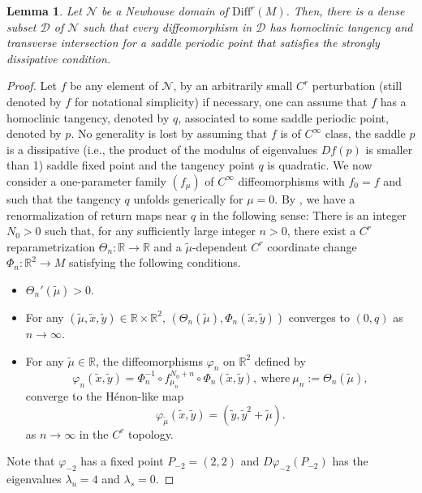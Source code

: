 \documentclass{amsart}
\theoremstyle{plain}
\newtheorem{lem}[thm]{Lemma}
\theoremstyle{definition}
\theoremstyle{remark}
\numberwithin{equation}{section}
\begin{document}
\begin{lem}
Let $\mathcal{N}$ be a Newhouse domain of $\mathrm{Diff}^r(M)$. Then, there is a dense subset $\mathcal{D}$ of $\mathcal{N}$ such that 
every diffeomorphism in $\mathcal{D}$ 
has homoclinic tangency and transverse intersection for 
a saddle periodic point that satisfies the strongly dissipative condition.
\end{lem}
\begin{proof}
Let $f$ be any element of $\mathcal{N}$, by an arbitrarily small $C^r$ perturbation (still denoted by $f$ for notational simplicity) if necessary, one can assume that $f$ has a homoclinic tangency, denoted by $q$, associated to some saddle periodic point, denoted by $p$. 
No generality is lost by assuming that $f$ is of $C^{\infty}$ class,  
the saddle $p$ is a dissipative (i.e., the product of the modulus of eigenvalues $Df(p)$ is smaller than 1) saddle fixed point
 and the tangency point $q$ is quadratic.
We now consider a one-parameter family $(f_{\mu})$ of $C^{\infty}$ diffeomorphisms with $f_{0}=f$ and such that the  tangency $q$ unfolds generically for $\mu=0$. 
By \cite[\S 3.4, Theorem 1]{PT1995}, we have a 
renormalization of return maps near $q$ in the following sense:
There is an integer $N_{0}>0$ such that, for any sufficiently large integer $n>0$, 
there exist a $C^{r}$ reparametrization  $\Theta_{n}:\mathbb{R}\to \mathbb{R}$ and a $\tilde \mu$-dependent $C^r$ coordinate change $\Phi_{n}:\mathbb{R}^2\to M$ satisfying the following conditions.
\begin{itemize}
\item
$\Theta_{n}'(\tilde \mu)>0$.
\item
For any $(\tilde\mu,\tilde x,\tilde y)\in \mathbb{R}\times \mathbb{R}^2$,
$(\Theta_n(\tilde \mu), \Phi_n(\tilde x,\tilde y))$ converges to $(0, q)$ as $n\rightarrow \infty$.
\item
For any $\tilde \mu\in \mathbb{R}$, the diffeomorphisms $\varphi_n$ 
on $\mathbb{R}^2$ defined by
\[
\varphi_{n}(\tilde{x},\tilde{y})= 
  \Phi_{n}^{-1}\circ f_{\mu_{n}}^{N_{0}+n}\circ \Phi_{n}(\tilde{x},\tilde{y}),\ \text{where}\ \mu_{n}:=\Theta_{n}(\tilde{\mu}),
\]
converge to the H\'enon-like map 
\[
\varphi_{\tilde{\mu}}(\tilde{x},\tilde{y})=( \tilde{y}, \tilde{y}^{2}+\tilde{\mu} ).
\]
as $n\rightarrow \infty$  in the $C^r$ topology.
\end{itemize}
Note that $\varphi_{-2}$ has a fixed point $P_{-2}=(2,2)$ 
and $D\varphi_{-2}(P_{-2})$ has the eigenvalues 
$\lambda_{u}=4$ and $\lambda_{s}=0$. 


\end{proof}
\end{document}
